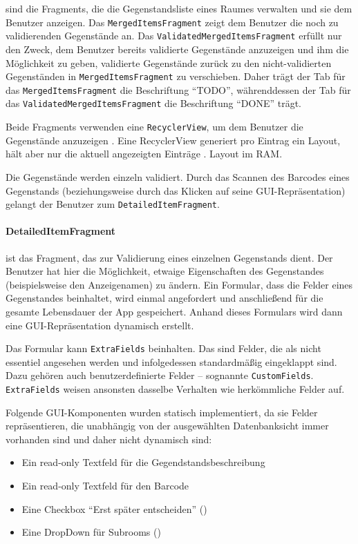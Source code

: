 sind die Fragments, die die Gegenstandsliste eines Raumes verwalten und
sie dem Benutzer anzeigen. Das \texttt{MergedItemsFragment} zeigt dem
Benutzer die noch zu validierenden Gegenstände an. Das
\texttt{ValidatedMergedItemsFragment} erfüllt nur den Zweck, dem
Benutzer bereits validierte Gegenstände anzuzeigen und ihm die
Möglichkeit zu geben, validierte Gegenstände zurück zu den
nicht-validierten Gegenständen in \texttt{MergedItemsFragment} zu
verschieben. Daher trägt der Tab für das \texttt{MergedItemsFragment}
die Beschriftung ``TODO'', währenddessen der Tab für das
\texttt{ValidatedMergedItemsFragment} die Beschriftung ``DONE'' trägt.

Beide Fragments verwenden eine \texttt{RecyclerView}, um dem Benutzer
die Gegenstände anzuzeigen \cite{recyclerview}. Eine RecyclerView
generiert pro Eintrag ein Layout, hält aber nur die aktuell angezeigten
Einträge \inkl. Layout im RAM.

Die Gegenstände werden einzeln validiert. Durch das Scannen des Barcodes
eines Gegenstands (beziehungsweise durch das Klicken auf seine
GUI-Repräsentation) gelangt der Benutzer zum
\texttt{DetailedItemFragment}.

\hypertarget{detaileditemfragment}{%
\paragraph{DetailedItemFragment}\label{detaileditemfragment}}

ist das Fragment, das zur Validierung eines einzelnen Gegenstands dient.
Der Benutzer hat hier die Möglichkeit, etwaige Eigenschaften des
Gegenstandes (beispielsweise den Anzeigenamen) zu ändern. Ein Formular,
dass die Felder eines Gegenstandes beinhaltet, wird einmal angefordert
und anschließend für die gesamte Lebensdauer der App gespeichert. Anhand
dieses Formulars wird dann eine GUI-Repräsentation dynamisch erstellt.

Das Formular kann \texttt{ExtraFields} beinhalten. Das sind Felder, die
als nicht essentiel angesehen werden und infolgedessen standardmäßig
eingeklappt sind. Dazu gehören auch benutzerdefinierte Felder --
sognannte \texttt{CustomFields}. \texttt{ExtraFields} weisen ansonsten
dasselbe Verhalten wie herkömmliche Felder auf.

Folgende GUI-Komponenten wurden statisch implementiert, da sie Felder
repräsentieren, die unabhängig von der ausgewählten Datenbanksicht immer
vorhanden sind und daher nicht dynamisch sind:

\begin{itemize}
\tightlist
\item
  Ein read-only Textfeld für die Gegendstandsbeschreibung
\item
  Ein read-only Textfeld für den Barcode
\item
  Eine Checkbox ``Erst später entscheiden''
  ()
\item
  Eine DropDown für Subrooms ()
\end{itemize}

